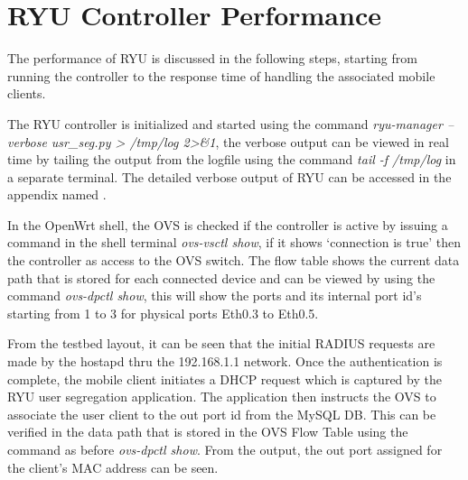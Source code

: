 \section{RYU Controller Performance}
The performance of RYU is discussed in the following steps, starting from running the controller to the response time of handling the associated mobile clients.

The RYU controller is initialized and started using the command \textit{ryu-manager --verbose usr\_seg.py > /tmp/log 2>\&1}, the verbose output can be viewed in real time by tailing the output from the logfile using the command \textit{tail -f /tmp/log} in a separate terminal. The detailed verbose output of RYU can be accessed in the appendix named .
 
In the OpenWrt shell, the OVS is checked if the controller is active by issuing a command in the shell terminal \textit{ovs-vsctl show}, if it shows ‘connection is true’ then the controller as access to the OVS switch. The flow table shows the current data path that is stored for each connected device and can be viewed by using the command \textit{ovs-dpctl show}, this will show the ports and its internal port id’s starting from 1 to 3 for physical ports Eth0.3 to Eth0.5.

From the testbed layout, it can be seen that the initial RADIUS requests are made by the hostapd thru the 192.168.1.1 network. Once the authentication is complete, the mobile client initiates a DHCP request which is captured by the RYU user segregation application. The application then instructs the OVS to associate the user client to the out port id from the MySQL DB. This can be verified in the data path that is stored in the OVS Flow Table using the command as before \textit{ovs-dpctl show}. From the output, the out port assigned for the client's MAC address can be seen.

